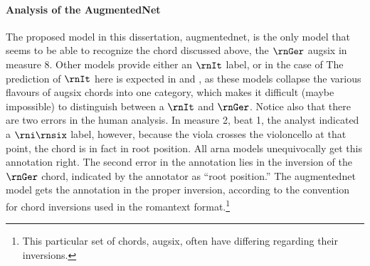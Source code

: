 \paragraph{Analysis of the AugmentedNet}

The proposed model in this dissertation, \gls{augmentednet},
is the only model that seems to be able to recognize the
chord discussed above, the $\rnGer$ \gls{augsix} in measure
8. Other models provide either an $\rnIt$ label, or in the
case of The prediction of $\rnIt$ here is expected in
\textcite{chen2021attend} and \textcite{micchi2021deep}, as
these models collapse the various flavours of \gls{augsix}
chords into one category, which makes it difficult (maybe
impossible) to distinguish between a $\rnIt$ and $\rnGer$.
Notice also that there are two errors in the human analysis.
In measure 2, beat 1, the analyst indicated a $\rni\rnsix$
label, however, because the viola crosses the violoncello at
that point, the chord is in fact in root position. All
\gls{arna} models unequivocally get this annotation right.
The second error in the annotation lies in the inversion of
the $\rnGer$ chord, indicated by the annotator as ``root
position.'' The \gls{augmentednet} model gets the annotation
in the proper inversion, according to the convention for
chord inversions used in the \gls{romantext}
format.\footnote{This particular set of chords,
\gls{augsix}, often have differing regarding their
inversions.}

